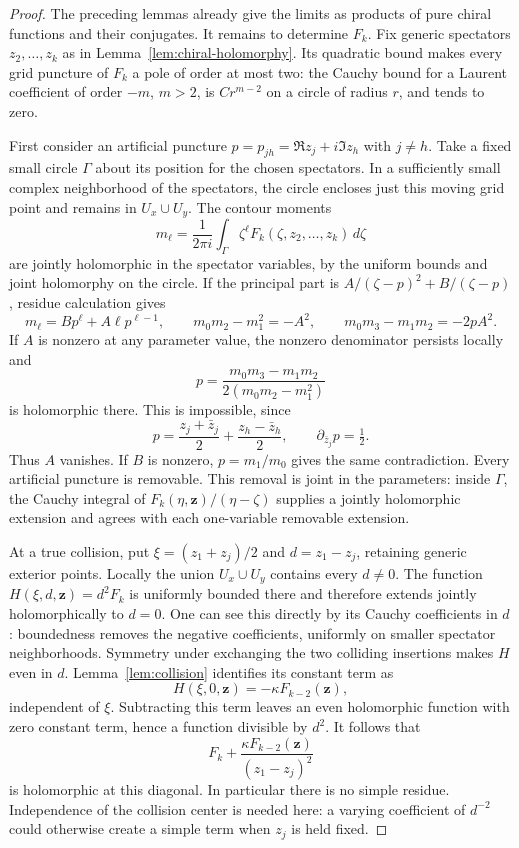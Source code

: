 \begin{proof}
The preceding lemmas already give the limits as products of pure chiral
functions and their conjugates. It remains to determine $F_k$.
Fix generic spectators $z_2,\ldots,z_k$ as in
Lemma~\ref{lem:chiral-holomorphy}. Its quadratic bound makes every
grid puncture of $F_k$ a pole of order at most two: the Cauchy bound
for a Laurent coefficient of order $-m$, $m>2$, is $Cr^{m-2}$ on a
circle of radius $r$, and tends to zero.

First consider an artificial puncture
$p=p_{jh}=\Re z_j+i\Im z_h$ with $j\ne h$.
Take a fixed small circle $\Gamma$ about its position for the chosen
spectators. In a sufficiently small complex neighborhood of the
spectators, the circle encloses just this moving grid point and remains
in $U_x\cup U_y$. The contour moments
\[
 m_\ell=\frac1{2\pi i}\int_\Gamma
                  \zeta^\ell F_k(\zeta,z_2,\ldots,z_k)\,d\zeta
\]
are jointly holomorphic in the spectator variables, by the uniform
bounds and joint holomorphy on the circle. If the principal part is
$A/(\zeta-p)^2+B/(\zeta-p)$, residue calculation gives
\begin{equation}\label{eq:chiral-pole-moments}
 m_\ell=Bp^\ell+A\ell p^{\ell-1},\qquad
 m_0m_2-m_1^2=-A^2,\qquad
 m_0m_3-m_1m_2=-2pA^2.
\end{equation}
If $A$ is nonzero at any parameter value, the nonzero denominator
persists locally and
\[
             p=\frac{m_0m_3-m_1m_2}
                       {2(m_0m_2-m_1^2)}
\]
is holomorphic there. This is impossible, since
\[
 p=\frac{z_j+\bar z_j}{2}+\frac{z_h-\bar z_h}{2},
                         \qquad \partial_{\bar z_j}p=\tfrac12.
\]
Thus $A$ vanishes. If $B$ is nonzero, $p=m_1/m_0$ gives the same
contradiction. Every artificial puncture is removable.
This removal is joint in the parameters: inside $\Gamma$, the Cauchy
integral of $F_k(\eta,\mathbf z)/(\eta-\zeta)$ supplies a jointly
holomorphic extension and agrees with each one-variable removable
extension.

At a true collision, put
$\xi=(z_1+z_j)/2$ and $d=z_1-z_j$, retaining generic exterior points.
Locally the union $U_x\cup U_y$ contains every $d\ne0$.
The function
$H(\xi,d,\mathbf z)=d^2F_k$ is uniformly bounded there and therefore
extends jointly holomorphically to $d=0$. One can see this directly
by its Cauchy coefficients in $d$: boundedness removes the negative
coefficients, uniformly on smaller spectator neighborhoods.
Symmetry under exchanging the two colliding insertions makes $H$ even
in $d$. Lemma~\ref{lem:collision} identifies its constant term as
\[
 H(\xi,0,\mathbf z)
             =-\kappa F_{k-2}(\mathbf z),
\]
independent of $\xi$. Subtracting this term leaves an even holomorphic
function with zero constant term, hence a function divisible by $d^2$.
It follows that
\[
 F_k+\frac{\kappa F_{k-2}(\mathbf z)}{(z_1-z_j)^2}
\]
is holomorphic at this diagonal. In particular there is no simple
residue. Independence of the collision center is needed here: a varying
coefficient of $d^{-2}$ could otherwise create a simple term when
$z_j$ is held fixed.


\end{proof}
